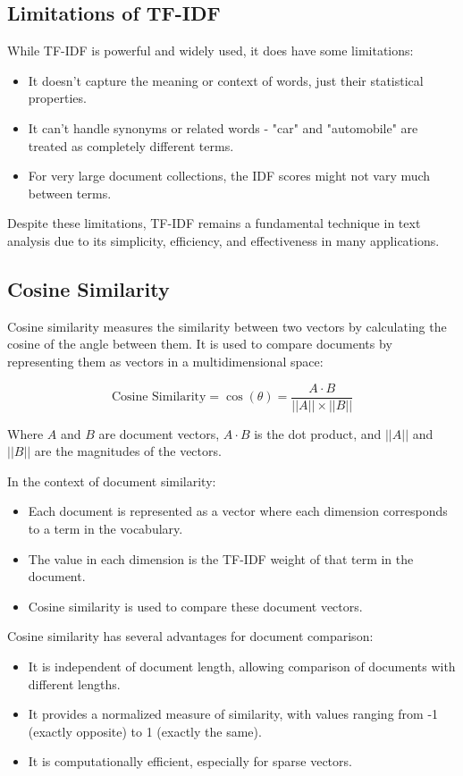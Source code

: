 \documentclass{article}
\begin{document}
\subsection{Limitations of TF-IDF}
While TF-IDF is powerful and widely used, it does have some limitations:

\begin{itemize}
    \item It doesn't capture the meaning or context of words, just their statistical properties.
    \item It can't handle synonyms or related words - "car" and "automobile" are treated as completely different terms.
    \item For very large document collections, the IDF scores might not vary much between terms.
\end{itemize}

Despite these limitations, TF-IDF remains a fundamental technique in text analysis due to its simplicity, efficiency, and effectiveness in many applications.

\subsection{Cosine Similarity}
Cosine similarity measures the similarity between two vectors by calculating the cosine of the angle between them. It is used to compare documents by representing them as vectors in a multidimensional space:

\begin{equation}
\text{Cosine Similarity} = \cos(\theta) = \frac{A \cdot B}{||A|| \times ||B||}
\end{equation}

Where $A$ and $B$ are document vectors, $A \cdot B$ is the dot product, and $||A||$ and $||B||$ are the magnitudes of the vectors.

In the context of document similarity:
\begin{itemize}
    \item Each document is represented as a vector where each dimension corresponds to a term in the vocabulary.
    \item The value in each dimension is the TF-IDF weight of that term in the document.
    \item Cosine similarity is used to compare these document vectors.
\end{itemize}

Cosine similarity has several advantages for document comparison:
\begin{itemize}
    \item It is independent of document length, allowing comparison of documents with different lengths.
    \item It provides a normalized measure of similarity, with values ranging from -1 (exactly opposite) to 1 (exactly the same).
    \item It is computationally efficient, especially for sparse vectors.
\end{itemize}
\end{document}

